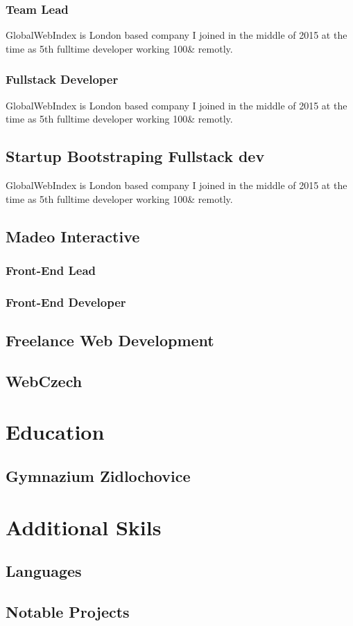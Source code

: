\documentclass[9pt]{article}
\begin{document}
\subsubsection{Team Lead}
GlobalWebIndex is London based company I joined in the middle of 2015 at the time as 5th fulltime developer
working 100\& remotly.

\subsubsection{Fullstack Developer}
GlobalWebIndex is London based company I joined in the middle of 2015 at the time as 5th fulltime developer
working 100\& remotly.

\subsection{Startup Bootstraping Fullstack dev}
GlobalWebIndex is London based company I joined in the middle of 2015 at the time as 5th fulltime developer
working 100\& remotly.

\subsection{Madeo Interactive}

\subsubsection{Front-End Lead}

\subsubsection{Front-End Developer}

\subsection{Freelance Web Development}

\subsection{WebCzech}

\section{Education}

\subsection{Gymnazium Zidlochovice}

\section{Additional Skils}

\subsection{Languages}


\subsection{Notable Projects}
\end{document}
